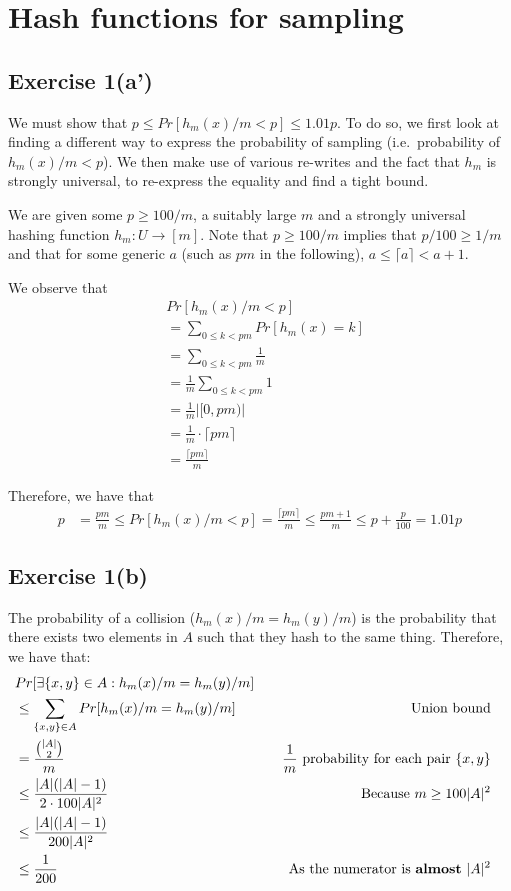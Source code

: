 \section{Hash functions for sampling}
\subsection{Exercise 1(a')}
We must show that $p \leq Pr[h_m(x)/m < p] \leq 1.01p$. To do so, we first
look at finding a different way to express the probability of sampling (i.e.\ probability
of $h_m(x)/m < p$). We then make use of various re-writes and the fact that $h_m$ is
strongly universal, to re-express the equality and find a tight bound.

We are given some $p \geq 100/m$, a suitably large $m$ and a strongly universal hashing
function $h_m : U \rightarrow [m]$. Note that $p \geq 100/m$ implies that $p/100 \geq 1/m$ 
and that for some generic $a$ (such as $pm$ in the following), $a \leq \lceil a \rceil < a+1$.

We observe that
\begin{align*}
	& Pr[h_m(x)/m < p] \\
	&= \sum_{0 \leq k < pm} Pr[h_m(x) = k] \\
	&= \sum_{0 \leq k < pm} \frac{1}{m} \\
	&= \frac{1}{m} \sum_{0 \leq k < pm} 1 \\
	&= \frac{1}{m} \left| [0,pm) \right| \\
	&= \frac{1}{m} \cdot \lceil pm \rceil \\
	&= \frac{\lceil pm \rceil}{m}
\end{align*}

Therefore, we have that
\begin{align*}
	p 	&= \frac{pm}{m} \leq Pr[h_m(x)/m < p] = \frac{\lceil pm \rceil}{m} \leq \frac{pm+1}{m} 
		\leq p + \frac{p}{100} = 1.01p
\end{align*}

\subsection{Exercise 1(b)}
The probability of a collision ($h_m(x)/m = h_m(y)/m$) is the probability
that there exists two elements in $A$ such that they hash to the same thing.
Therefore, we have that:
\begin{align*}
	& Pr[\exists \{x,y\} \in A : h_m(x)/m = h_m(y)/m] & \\
	& \leq \sum_{\{x,y\}\in A} Pr[h_m(x)/m = h_m(y)/m] & \quad \text{Union bound} \\
	& = \frac{\binom{|A|}{2}}{m} & \quad \text{$\frac{1}{m}$ probability for each pair $\{x,y\}$}\\
	& \leq \frac{|A|(|A|-1)}{2 \cdot 100|A|^2} & \quad \text{Because $m \geq 100|A|^2$} \\
	& \leq \frac{|A|(|A|-1)}{200|A|^2} & \\
	& \leq \frac{1}{200} & \quad \text{As the numerator is \textbf{almost} $|A|^2$} &
\end{align*}